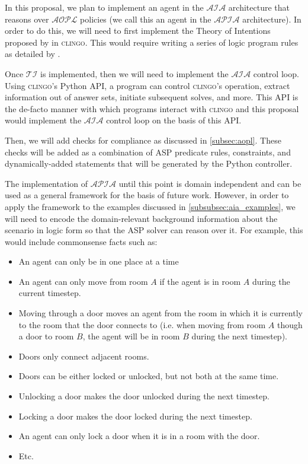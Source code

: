 In this proposal, we plan to implement an agent in the $\mathcal{AIA}$ architecture that reasons over $\mathcal{AOPL}$ policies (we call this an agent in the $\mathcal{APIA}$ architecture).
In order to do this, we will need to first implement the Theory of Intentions proposed by \citet{blount_towards_2014} in \textsc{clingo}.
This would require writing a series of logic program rules as detailed by \citet{blount_towards_2014}.

Once $\mathcal{TI}$ is implemented, then we will need to implement the $\mathcal{AIA}$ control loop.
Using \textsc{clingo}'s Python API, a program can control \textsc{clingo}'s operation, extract information out of answer sets, initiate subsequent solves, and more.
This API is the de-facto manner with which programs interact with \textsc{clingo} and this proposal would implement the $\mathcal{AIA}$ control loop on the basis of this API.

Then, we will add checks for compliance as discussed in \cref{subsec:aopl}.
These checks will be added as a combination of ASP predicate rules, constraints, and dynamically-added statements that will be generated by the Python controller.

The implementation of $\mathcal{APIA}$ until this point is domain independent and can be used as a general framework for the basis of future work.
However, in order to apply the framework to the examples discussed in \cref{subsubsec:aia_examples}, we will need to encode the domain-relevant background information about the scenario in logic form so that the ASP solver can reason over it.
For example, this would include commonsense facts such as:

\begin{itemize}
    \item An agent can only be in one place at a time
    \item An agent can only move from room $A$ if the agent is in room $A$ during the current timestep.
    \item Moving through a door moves an agent from the room in which it is currently to the room that the door connects to (i.e. when moving from room $A$ though a door to room $B$, the agent will be in room $B$ during the next timestep).
    \item Doors only connect adjacent rooms.
    \item Doors can be either locked or unlocked, but not both at the same time.
    \item Unlocking a door makes the door unlocked during the next timestep.
    \item Locking a door makes the door locked during the next timestep.
    \item An agent can only lock a door when it is in a room with the door.
    \item Etc.
\end{itemize}

